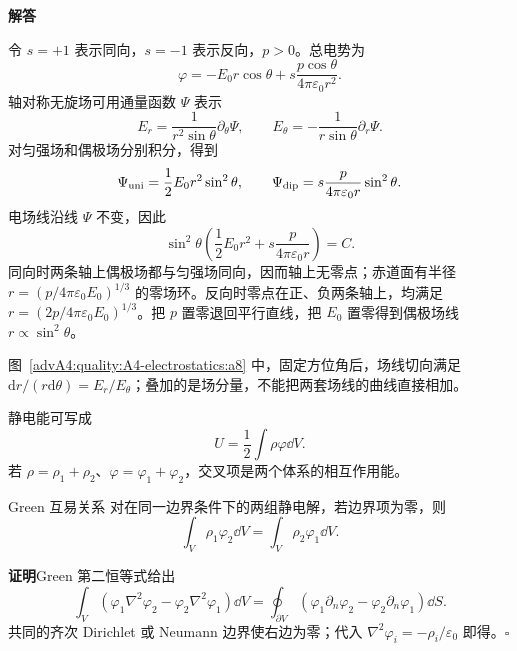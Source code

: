 \begin{advsolution}
\begin{center}\begin{minipage}{.96\linewidth}\centering
\raggedright{\bfseries\color{DeepBlue}解答}\par\smallskip\centering

\label{advA4:quality:A4-electrostatics:a8}
\end{minipage}\end{center}

令 $s=+1$ 表示同向，$s=-1$ 表示反向，$p>0$。总电势为
\[
 \varphi=-E_0r\cos\theta+s\frac{p\cos\theta}{4\pi\varepsilon_0r^2}.
\]
轴对称无旋场可用通量函数 $\Psi$ 表示
\[
 E_r=\frac1{r^2\sin\theta}\partial_\theta\Psi,
 \qquad
 E_\theta=-\frac1{r\sin\theta}\partial_r\Psi.
\]
对匀强场和偶极场分别积分，得到
\[
 \Psi_{\rm uni}=\frac12E_0r^2\sin^2\theta,
 \qquad
 \Psi_{\rm dip}=s\frac{p}{4\pi\varepsilon_0r}\sin^2\theta.
\]
电场线沿线 $\Psi$ 不变，因此
\[
 \boxed{\sin^2\theta\left(
 \frac12E_0r^2+s\frac{p}{4\pi\varepsilon_0r}
 \right)=C}.
\]
同向时两条轴上偶极场都与匀强场同向，因而轴上无零点；赤道面有半径 $r=(p/4\pi\varepsilon_0E_0)^{1/3}$ 的零场环。反向时零点在正、负两条轴上，均满足 $r=(2p/4\pi\varepsilon_0E_0)^{1/3}$。把 $p$ 置零退回平行直线，把 $E_0$ 置零得到偶极场线 $r\propto\sin^2\theta$。

图~\ref{advA4:quality:A4-electrostatics:a8} 中，固定方位角后，场线切向满足 $\mathrm dr/(r\mathrm d\theta)=E_r/E_\theta$；叠加的是场分量，不能把两套场线的曲线直接相加。
\end{advsolution}

静电能可写成
\[
 U=\frac12\int\rho\varphi\dd V.
\]
若 $\rho=\rho_1+\rho_2$、$\varphi=\varphi_1+\varphi_2$，交叉项是两个体系的相互作用能。

\begin{advtheorem}{Green 互易关系}\label{advA4:thm:green-reciprocity}
对在同一边界条件下的两组静电解，若边界项为零，则
\[
 \boxed{\int_V\rho_1\varphi_2\dd V=
 \int_V\rho_2\varphi_1\dd V}.
\]
\end{advtheorem}
\noindent\textbf{证明}\quad Green 第二恒等式给出
\[
 \int_V(\varphi_1\nabla^2\varphi_2-\varphi_2\nabla^2\varphi_1)\dd V
 =\oint_{\partial V}(\varphi_1\partial_n\varphi_2-\varphi_2\partial_n\varphi_1)\dd S.
\]
共同的齐次 Dirichlet 或 Neumann 边界使右边为零；代入
$\nabla^2\varphi_i=-\rho_i/\varepsilon_0$ 即得。\hfill$\square$


